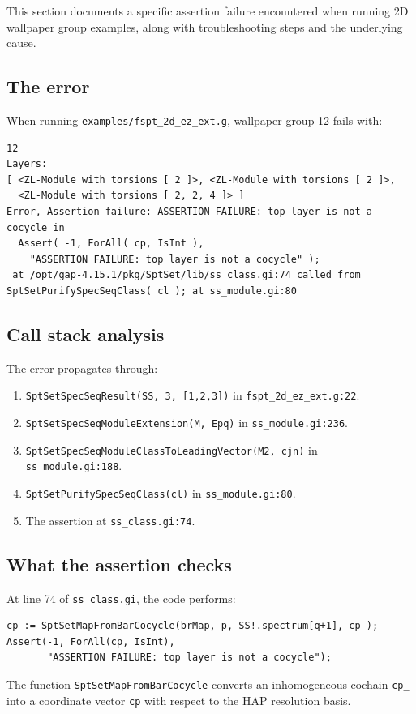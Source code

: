 \documentclass{SciPost}
\begin{document}
This section documents a specific assertion failure encountered when running 2D wallpaper group examples, along with troubleshooting steps and the underlying cause.

\subsection{The error}

When running \texttt{examples/fspt\_2d\_ez\_ext.g}, wallpaper group 12 fails with:
\begin{verbatim}
12
Layers:
[ <ZL-Module with torsions [ 2 ]>, <ZL-Module with torsions [ 2 ]>,
  <ZL-Module with torsions [ 2, 2, 4 ]> ]
Error, Assertion failure: ASSERTION FAILURE: top layer is not a cocycle in
  Assert( -1, ForAll( cp, IsInt ),
    "ASSERTION FAILURE: top layer is not a cocycle" );
 at /opt/gap-4.15.1/pkg/SptSet/lib/ss_class.gi:74 called from
SptSetPurifySpecSeqClass( cl ); at ss_module.gi:80
\end{verbatim}

\subsection{Call stack analysis}

The error propagates through:
\begin{enumerate}
    \item \texttt{SptSetSpecSeqResult(SS, 3, [1,2,3])} in \texttt{fspt\_2d\_ez\_ext.g:22}.
    \item \texttt{SptSetSpecSeqModuleExtension(M, Epq)} in \texttt{ss\_module.gi:236}.
    \item \texttt{SptSetSpecSeqModuleClassToLeadingVector(M2, cjn)} in \texttt{ss\_module.gi:188}.
    \item \texttt{SptSetPurifySpecSeqClass(cl)} in \texttt{ss\_module.gi:80}.
    \item The assertion at \texttt{ss\_class.gi:74}.
\end{enumerate}

\subsection{What the assertion checks}

At line 74 of \texttt{ss\_class.gi}, the code performs:
\begin{verbatim}
cp := SptSetMapFromBarCocycle(brMap, p, SS!.spectrum[q+1], cp_);
Assert(-1, ForAll(cp, IsInt),
       "ASSERTION FAILURE: top layer is not a cocycle");
\end{verbatim}
The function \texttt{SptSetMapFromBarCocycle} converts an inhomogeneous cochain \texttt{cp\_} into a coordinate vector \texttt{cp} with respect to the HAP resolution basis.
\end{document}
